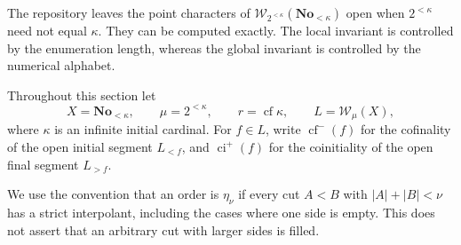 \documentclass[11pt]{article}
\theoremstyle{definition}
\theoremstyle{remark}
\newcommand{\No}{\mathbf{No}}
\newcommand{\WO}{\mathcal W}
\newcommand{\cf}{\operatorname{cf}}
\begin{document}

The repository leaves the point characters of
$\WO_{2^{<\kappa}}(\No_{<\kappa})$ open when
$2^{<\kappa}$ need not equal $\kappa$.  They can be computed exactly.
The local invariant is controlled by the enumeration length, whereas
the global invariant is controlled by the numerical alphabet.

Throughout this section let
\[
 X=\No_{<\kappa},\qquad \mu=2^{<\kappa},\qquad
 r=\cf\kappa,\qquad L=\WO_\mu(X),
\]
where $\kappa$ is an infinite initial cardinal.  For $f\in L$, write
$\operatorname{cf}^{-}(f)$ for the cofinality of the open initial
segment $L_{<f}$, and $\operatorname{ci}^{+}(f)$ for the coinitiality
of the open final segment $L_{>f}$.

We use the convention that an order is $\eta_\nu$ if every cut
$A<B$ with $|A|+|B|<\nu$ has a strict interpolant, including the
cases where one side is empty.  This does not assert that an arbitrary
cut with larger sides is filled.
\end{document}
